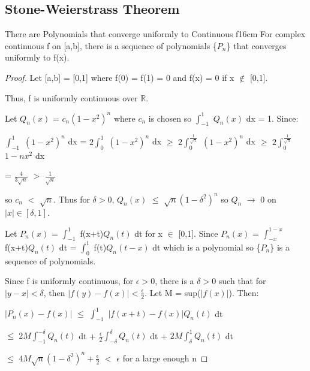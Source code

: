 \subsection[ Stone-Weierstrass ]{ Stone-Weierstrass Theorem }

    \begin{wtheorem}{There are Polynomials that converge uniformly to
    Continuous f}{16cm}
        For complex continuous f on [a,b], there is a sequence of polynomials
        \{$P_n$\} that converges uniformly to f(x).
    \end{wtheorem}

    \begin{proof}
        Let [a,b] = [0,1] where f(0) = f(1) = 0 and f(x) = 0 if x $\not \in$ [0,1].

        Thus, f is uniformly continuous over $\mathbb{R}$.

        Let $Q_n(x)$ = $c_n(1-x^2)^n$ where $c_n$ is chosen so
        $\int_{-1}^1$ $Q_n(x)$ dx = 1.
        Since:

        \hspace{0.5cm}
        $\int_{-1}^1$ $(1-x^2)^n$ dx
        = $2 \int_0^1$ $(1-x^2)^n$ dx
        $\geq$ $2 \int_0^{\frac{1}{\sqrt{n}}}$ $(1-x^2)^n$ dx
        $\geq$ $2 \int_0^{\frac{1}{\sqrt{n}}}$ $1-nx^2$ dx

        \hspace{3.6cm}
        = $\frac{4}{3\sqrt{n}}$
        $>$ $\frac{1}{\sqrt{n}}$

        so $c_n$ $<$ $\sqrt{n}$.
        Thus for $\delta > 0$, $Q_n(x)$ $\leq$ $\sqrt{n}(1-\delta^2)^n$
        so $Q_n$ $\rightarrow$ 0 on $|x| \in [\delta,1]$.

        Let $P_n(x)$ = $\int_{-1}^1$ f(x+t)$Q_n(t)$ dt for x $\in$ [0,1].
        Since $P_n(x)$ = $\int_{-x}^{1-x}$ f(x+t)$Q_n(t)$ dt
        = $\int_0^1$ f(t)$Q_n(t-x)$ dt which is a polynomial so \{$P_n$\}
        is a sequence of polynomials.

        Since f is uniformly continuous, for $\epsilon > 0$, there is a $\delta > 0$
        such that for $|y-x| < \delta$, then $|f(y) - f(x)| < \frac{\epsilon}{2}$.
        Let M = sup($|f(x)|$). Then:

        \hspace{0.5cm}
        $|P_n(x) - f(x)|$
        $\leq$ $\int_{-1}^1$ $|f(x+t)-f(x)| Q_n(t)$ dt

        \hspace{3.2cm}
        $\leq$ $2M \int_{-1}^{-\delta} Q_n(t)$ dt
                + $\frac{\epsilon}{2} \int_{-\delta}^{\delta} Q_n(t)$ dt
                + $2M \int_{\delta}^{1} Q_n(t)$ dt

        \hspace{3.2cm}
        $\leq$ $4M\sqrt{n}(1-\delta^2)^n + \frac{\epsilon}{2}$
        $<$ $\epsilon$
        \hspace{1cm}
        for a large enough n
    \end{proof}

